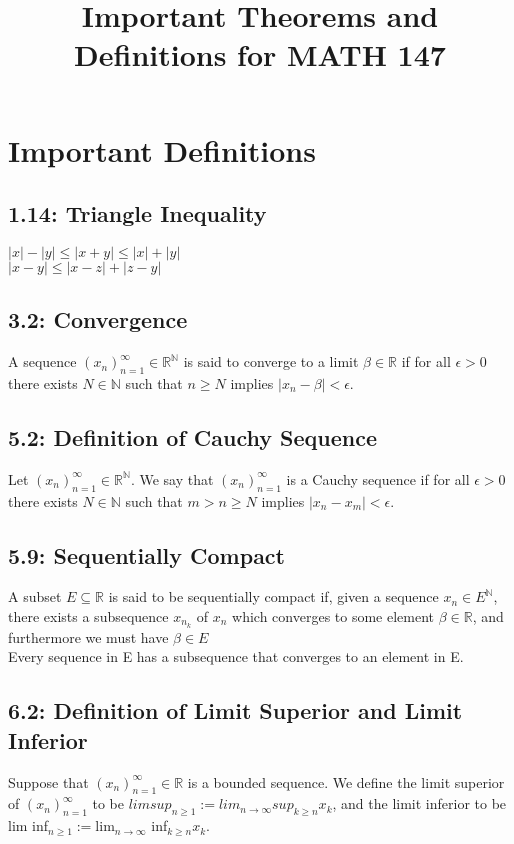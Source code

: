 \documentclass[10pt,letter]{report}
\begin{document}
\title{Important Theorems and Definitions for MATH 147}

\chapter*{Important Definitions}
\section*{1.14: Triangle Inequality}
$|x|-|y|\leq|x+y|\leq|x| + |y|$\\ 
$|x - y| \leq |x - z| + |z - y|$

\section*{3.2: Convergence}
A sequence $(x_n)_{n=1}^\infty\in\mathbb{R}^\mathbb{N}$ is said to converge to a limit $\beta\in\mathbb{R}$ if for all $\epsilon>0$ there exists $N\in\mathbb{N}$ such that $n\geq N$ implies $|x_n-\beta|<\epsilon$. 

\section*{5.2: Definition of Cauchy Sequence}
Let $(x_n)_{n=1}^\infty\in\mathbb{R}^\mathbb{N}$. We say that $(x_n)_{n=1}^\infty$ is a Cauchy sequence if for all $\epsilon > 0$ there exists $N\in\mathbb{N}$ such that $m > n \geq N$ implies $|x_n - x_m| < \epsilon$. 

\section*{5.9: Sequentially Compact}
A subset $E \subseteq \mathbb{R}$ is said to be sequentially compact if, given a sequence $x_n \in E^\mathbb{N}$, there exists a subsequence $x_{n_k}$ of $x_n$ which converges to some element $\beta \in \mathbb{R}$, and furthermore we must have $\beta \in E$\\ 
Every sequence in E has a subsequence that converges to an element in E. 

\section*{6.2: Definition of Limit Superior and Limit Inferior}
Suppose that $(x_n)_{n=1}^\infty \in \mathbb{R}$ is a bounded sequence. We define the limit superior of $(x_n)_{n=1}^\infty$ to be $lim sup_{n\geq 1} := lim_{n\rightarrow\infty} sup_{k\geq n} x_k$, and the limit inferior to be lim inf$_{n\geq 1} := $lim$_{n\rightarrow\infty}$ inf$_{k\geq n} x_k$.
\end{document}
